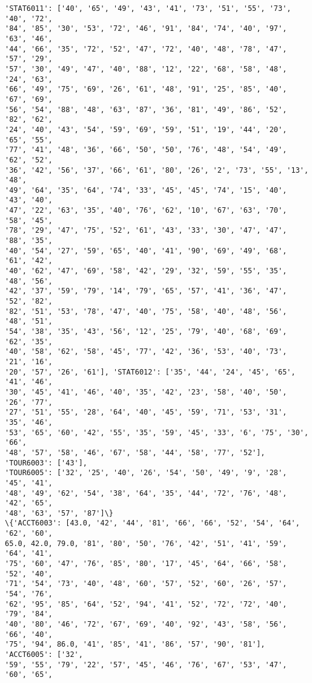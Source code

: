 \documentclass[11pt]{article}
\begin{document}
\begin{Verbatim}[commandchars=\\\{\}]
'STAT6011': ['40', '65', '49', '43', '41', '73', '51', '55', '73', '40', '72',
'84', '85', '30', '53', '72', '46', '91', '84', '74', '40', '97', '63', '46',
'44', '66', '35', '72', '52', '47', '72', '40', '48', '78', '47', '57', '29',
'57', '30', '49', '47', '40', '88', '12', '22', '68', '58', '48', '24', '63',
'66', '49', '75', '69', '26', '61', '48', '91', '25', '85', '40', '67', '69',
'56', '54', '88', '48', '63', '87', '36', '81', '49', '86', '52', '82', '62',
'24', '40', '43', '54', '59', '69', '59', '51', '19', '44', '20', '65', '55',
'77', '41', '48', '36', '66', '50', '50', '76', '48', '54', '49', '62', '52',
'36', '42', '56', '37', '66', '61', '80', '26', '2', '73', '55', '13', '48',
'49', '64', '35', '64', '74', '33', '45', '45', '74', '15', '40', '43', '40',
'47', '22', '63', '35', '40', '76', '62', '10', '67', '63', '70', '58', '45',
'78', '29', '47', '75', '52', '61', '43', '33', '30', '47', '47', '88', '35',
'40', '54', '27', '59', '65', '40', '41', '90', '69', '49', '68', '61', '42',
'40', '62', '47', '69', '58', '42', '29', '32', '59', '55', '35', '48', '56',
'42', '37', '59', '79', '14', '79', '65', '57', '41', '36', '47', '52', '82',
'82', '51', '53', '78', '47', '40', '75', '58', '40', '48', '56', '48', '51',
'54', '38', '35', '43', '56', '12', '25', '79', '40', '68', '69', '62', '35',
'40', '58', '62', '58', '45', '77', '42', '36', '53', '40', '73', '21', '16',
'20', '57', '26', '61'], 'STAT6012': ['35', '44', '24', '45', '65', '41', '46',
'30', '45', '41', '46', '40', '35', '42', '23', '58', '40', '50', '26', '77',
'27', '51', '55', '28', '64', '40', '45', '59', '71', '53', '31', '35', '46',
'53', '65', '60', '42', '55', '35', '59', '45', '33', '6', '75', '30', '66',
'48', '57', '58', '46', '67', '58', '44', '58', '77', '52'], 'TOUR6003': ['43'],
'TOUR6005': ['32', '25', '40', '26', '54', '50', '49', '9', '28', '45', '41',
'48', '49', '62', '54', '38', '64', '35', '44', '72', '76', '48', '42', '65',
'48', '63', '57', '87']\}
\{'ACCT6003': [43.0, '42', '44', '81', '66', '66', '52', '54', '64', '62', '60',
65.0, 42.0, 79.0, '81', '80', '50', '76', '42', '51', '41', '59', '64', '41',
'75', '60', '47', '76', '85', '80', '17', '45', '64', '66', '58', '52', '40',
'71', '54', '73', '40', '48', '60', '57', '52', '60', '26', '57', '54', '76',
'62', '95', '85', '64', '52', '94', '41', '52', '72', '72', '40', '79', '84',
'40', '80', '46', '72', '67', '69', '40', '92', '43', '58', '56', '66', '40',
'75', '94', 86.0, '41', '85', '41', '86', '57', '90', '81'], 'ACCT6005': ['32',
'59', '55', '79', '22', '57', '45', '46', '76', '67', '53', '47', '60', '65',

\end{Verbatim}
\end{document}
